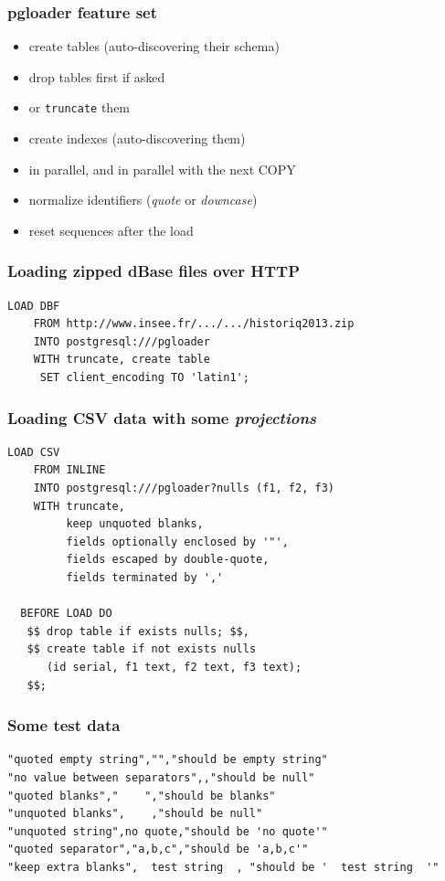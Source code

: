 \documentclass{beamer}
\begin{document}
\begin{frame}[fragile]
  \frametitle{pgloader feature set}
  
  \vfill

  \begin{itemize}
  \item create tables (auto-discovering their schema)
  \item drop tables first if asked
  \item or \texttt{truncate} them
  \item create indexes (auto-discovering them)
  \item in parallel, and in parallel with the next COPY
  \item normalize identifiers (\textit{quote} or \textit{downcase})
  \item reset sequences after the load
  \end{itemize}  
\end{frame}

\begin{frame}[fragile]
  \frametitle{Loading zipped dBase files over HTTP}
  
\begin{verbatim}
LOAD DBF
    FROM http://www.insee.fr/.../.../historiq2013.zip
    INTO postgresql:///pgloader
    WITH truncate, create table
     SET client_encoding TO 'latin1';
\end{verbatim}
\end{frame}

\begin{frame}[fragile]
  \frametitle{Loading CSV data with some \textit{projections}}
  
\begin{verbatim}
LOAD CSV
    FROM INLINE
    INTO postgresql:///pgloader?nulls (f1, f2, f3)
    WITH truncate,
    	 keep unquoted blanks,
         fields optionally enclosed by '"',
         fields escaped by double-quote,
         fields terminated by ','

  BEFORE LOAD DO
   $$ drop table if exists nulls; $$,
   $$ create table if not exists nulls
      (id serial, f1 text, f2 text, f3 text);
   $$;
\end{verbatim}
\end{frame}

\begin{frame}[fragile]
  \frametitle{Some test data}

\begin{verbatim}
"quoted empty string","","should be empty string"
"no value between separators",,"should be null"
"quoted blanks","    ","should be blanks"
"unquoted blanks",    ,"should be null"
"unquoted string",no quote,"should be 'no quote'"
"quoted separator","a,b,c","should be 'a,b,c'"
"keep extra blanks",  test string  , "should be '  test string  '"
\end{verbatim}
\end{frame}
\end{document}
